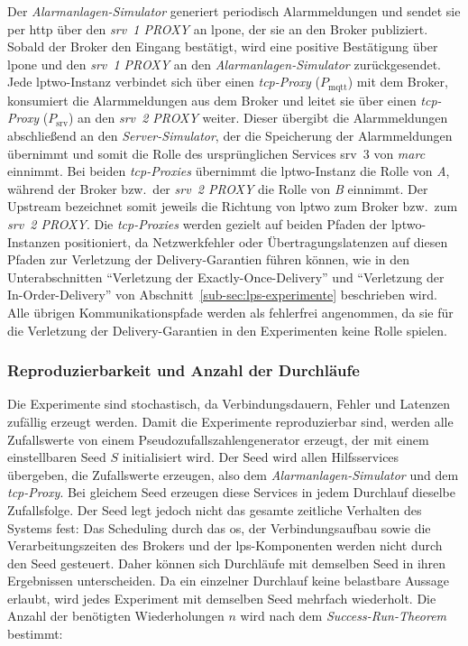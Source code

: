 Der \textit{Alarmanlagen-Simulator} generiert periodisch Alarmmeldungen und sendet sie per \gls{http} über den \textit{\gls{srv}~1 PROXY} an \gls{lpone}, der sie an den Broker publiziert. Sobald der Broker den Eingang bestätigt, wird eine positive Bestätigung über \gls{lpone} und den \textit{\gls{srv}~1 PROXY} an den \textit{Alarmanlagen-Simulator} zurückgesendet. Jede \gls{lptwo}-Instanz verbindet sich über einen \textit{\gls{tcp}-Proxy} ($P_{\text{mqtt}}$) mit dem Broker, konsumiert die Alarmmeldungen aus dem Broker und leitet sie über einen \textit{\gls{tcp}-Proxy} ($P_{\text{srv}}$) an den \textit{\gls{srv}~2 PROXY} weiter. Dieser übergibt die Alarmmeldungen abschließend an den \textit{Server-Simulator}, der die Speicherung der Alarmmeldungen übernimmt und somit die Rolle des ursprünglichen Services \gls{srv}~3 von \textit{\gls{marc}} einnimmt. Bei beiden \textit{\gls{tcp}-Proxies} übernimmt die \gls{lptwo}-Instanz die Rolle von \textit{A}, während der Broker bzw.~der \textit{\gls{srv}~2 PROXY} die Rolle von \textit{B} einnimmt. Der Upstream bezeichnet somit jeweils die Richtung von \gls{lptwo} zum Broker bzw.~zum \textit{\gls{srv}~2 PROXY}. Die \textit{\gls{tcp}-Proxies} werden gezielt auf beiden Pfaden der \gls{lptwo}-Instanzen positioniert, da Netzwerkfehler oder Übertragungslatenzen auf diesen Pfaden zur Verletzung der Delivery-Garantien führen können, wie in den Unterabschnitten \enquote{Verletzung der Exactly-Once-Delivery} und \enquote{Verletzung der In-Order-Delivery} von Abschnitt~\ref{sub-sec:lps-experimente} beschrieben wird. Alle übrigen Kommunikationspfade werden als fehlerfrei angenommen, da sie für die Verletzung der Delivery-Garantien in den Experimenten keine Rolle spielen.

\subsubsection{Reproduzierbarkeit und Anzahl der Durchläufe}
\label{sub-sub:lps-methodik}

Die Experimente sind stochastisch, da Verbindungsdauern, Fehler und Latenzen zufällig erzeugt werden. Damit die Experimente reproduzierbar sind, werden alle Zufallswerte von einem Pseudozufallszahlengenerator erzeugt, der mit einem einstellbaren Seed $S$ initialisiert wird. Der Seed wird allen Hilfsservices übergeben, die Zufallswerte erzeugen, also dem \textit{Alarmanlagen-Simulator} und dem \textit{\gls{tcp}-Proxy}. Bei gleichem Seed erzeugen diese Services in jedem Durchlauf dieselbe Zufallsfolge. Der Seed legt jedoch nicht das gesamte zeitliche Verhalten des Systems fest: Das Scheduling durch das \gls{os}, der Verbindungsaufbau sowie die Verarbeitungszeiten des Brokers und der \gls{lps}-Komponenten werden nicht durch den Seed gesteuert. Daher können sich Durchläufe mit demselben Seed in ihren Ergebnissen unterscheiden. Da ein einzelner Durchlauf keine belastbare Aussage erlaubt, wird jedes Experiment mit demselben Seed mehrfach wiederholt. Die Anzahl der benötigten Wiederholungen $n$ wird nach dem \textit{Success-Run-Theorem}~\citep{joshi2023, kececioglu1992} bestimmt:

